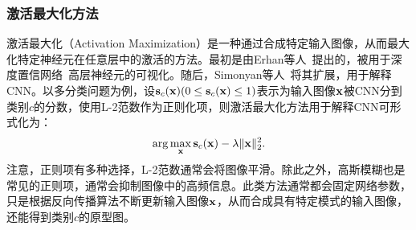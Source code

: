\subsubsection*{激活最大化方法}
激活最大化（Activation Maximization）是一种通过合成特定输入图像，从而最大化特定神经元在任意层中的激活的方法。最初是由Erhan等人~\cite{erhan2009visualizing}提出的，被用于深度置信网络~\cite{hinton2006fast}高层神经元的可视化。随后，Simonyan等人~\cite{simonyan2013deep}将其扩展，用于解释CNN。以多分类问题为例，设$\mathbf{s}_{c}(\mathbf{x})(0\leq \mathbf{s}_{c}(\mathbf{x}) \leq 1)$表示为输入图像$\mathbf{x}$被CNN分到类别$c$的分数，使用L-2范数作为正则化项，则激活最大化方法用于解释CNN可形式化为：
\begin{equation}
\arg \max _{\mathbf{x}} {\mathbf{s}}_{c}(\mathbf{x})-\lambda\|\mathbf{x}\|_{2}^{2}.
\end{equation}
注意，正则项有多种选择，L-2范数通常会将图像平滑。除此之外，高斯模糊也是常见的正则项，通常会抑制图像中的高频信息。此类方法通常都会固定网络参数，只是根据反向传播算法不断更新输入图像$\mathbf{x}$，从而合成具有特定模式的输入图像，还能得到类别$c$的原型图。


